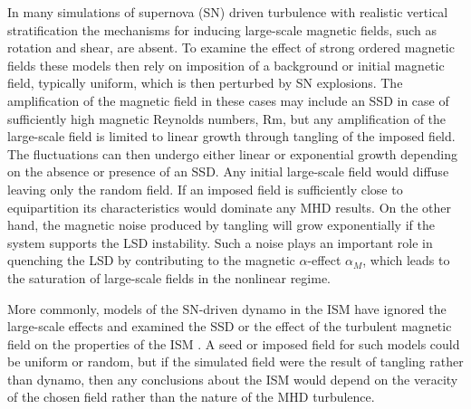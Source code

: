 \documentclass[preprint2]{aastex63}
\begin{document}
In many simulations of supernova (SN) driven turbulence with realistic vertical 
stratification \citep[e.g.,][]{deAvillez:2005,PO07,Hill:2012a,HI14} the
mechanisms for inducing large-scale magnetic fields, such as rotation and shear,
are absent.
To examine the effect of strong ordered magnetic fields these models then rely
on imposition of a background or initial magnetic field, typically uniform,
which is then perturbed by SN explosions.
The amplification of the magnetic field in these cases may include an SSD in
case of sufficiently high magnetic Reynolds numbers, Rm, but any amplification
of the large-scale field is limited to linear growth through tangling of the
imposed field.
The fluctuations can then undergo either linear or exponential growth
depending on the absence or presence of an SSD.
Any initial large-scale field would diffuse leaving only the random field. 
If an imposed field is sufficiently close to equipartition its characteristics
would dominate any MHD results.
On the other hand, the magnetic noise produced by tangling
will grow exponentially if the system supports the LSD instability.
Such a noise plays an important role in quenching the LSD by contributing
to the magnetic $\alpha$-effect $\alpha_M$, which leads to the saturation
of large-scale fields in the nonlinear regime.

More commonly, models of the SN-driven dynamo in the ISM have ignored the 
large-scale effects and examined the SSD or the effect of the
turbulent magnetic field on the properties of the ISM
\citep[e.g.,][]{BKMM04,BalKim05,MacLow:2005}.
A seed or imposed field for such models could be uniform or random, but if the
simulated field were the result of tangling rather than dynamo, then any
conclusions about the ISM would depend on the veracity of the chosen field
rather than the nature of the MHD turbulence.
\end{document}
